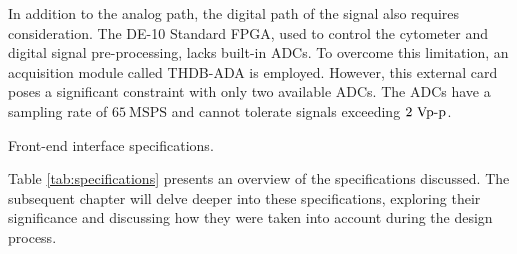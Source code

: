In addition to the analog path, the digital path of the signal also requires consideration. The DE-10 Standard \ac{FPGA}, used to control the cytometer and digital signal pre-processing, lacks built-in \ac{ADC}s. To overcome this limitation, an acquisition module called THDB-ADA is employed. However, this external card poses a significant constraint with only two available \ac{ADC}s. The \ac{ADC}s have a sampling rate of $\mathrm{65~MSPS}$ and cannot tolerate signals exceeding $\mathrm{2~Vp\textnormal{-}p}$.

\begin{table}[ht]
    \centering
    \caption{Front-end interface specifications.}
    \begin{small}
    
    \end{small}
    \label{tab:specifications}
\end{table}

Table \ref{tab:specifications} presents an overview of the specifications discussed. The subsequent chapter will delve deeper into these specifications, exploring their significance and discussing how they were taken into account during the design process.


\clearpage
\thispagestyle{empty}
\cleardoublepage
